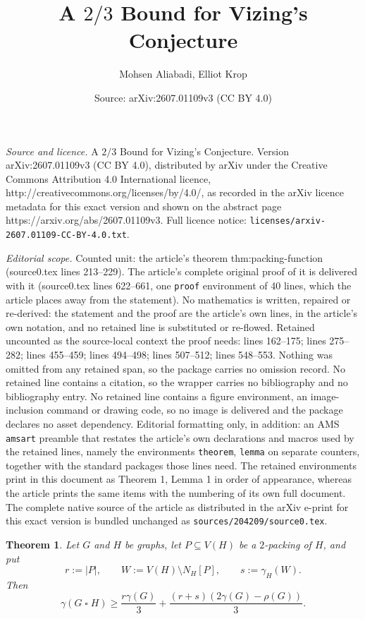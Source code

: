 \documentclass[10pt,a4paper]{amsart}
\title{A $2/3$ Bound for Vizing's Conjecture}
\author{Mohsen Aliabadi, Elliot Krop}
\date{Source: arXiv:2607.01109v3 (CC BY 4.0)}
\newtheorem{theorem}{Theorem}
\newcommand{\N}{N}
\newcommand{\V}{V}
\begin{document}
\maketitle

\noindent\emph{Source and licence.} A $2/3$ Bound for Vizing's Conjecture. Version arXiv:2607.01109v3 (CC BY 4.0), distributed by arXiv under the Creative Commons Attribution 4.0 International licence, http://creativecommons.org/licenses/by/4.0/, as recorded in the arXiv licence metadata for this exact version and shown on the abstract page https://arxiv.org/abs/2607.01109v3. Full licence notice: \texttt{licenses/arxiv-2607.01109-CC-BY-4.0.txt}.\par\smallskip

\noindent\textit{Editorial scope.} Counted unit: the article's theorem thm:packing-function (source0.tex lines 213--229). The article's complete original proof of it is delivered with it (source0.tex lines 622--661, one \texttt{proof} environment of 40 lines, which the article places away from the statement). No mathematics is written, repaired or re-derived: the statement and the proof are the article's own lines, in the article's own notation, and no retained line is substituted or re-flowed.  Retained uncounted as the source-local context the proof needs: lines 162--175; lines 275--282; lines 455--459; lines 494--498; lines 507--512; lines 548--553.  Nothing was omitted from any retained span, so the package carries no omission record.  No retained line contains a citation, so the wrapper carries no bibliography and no bibliography entry.  No retained line contains a figure environment, an image-inclusion command or drawing code, so no image is delivered and the package declares no asset dependency.  Editorial formatting only, in addition: an AMS \texttt{amsart} preamble that restates the article's own declarations and macros used by the retained lines, namely the environments \texttt{theorem}, \texttt{lemma} on separate counters, together with the standard packages those lines need.  The retained environments print in this document as Theorem 1, Lemma 1 in order of appearance, whereas the article prints the same items with the numbering of its own full document.  The complete native source of the article as distributed in the arXiv e-print for this exact version is bundled unchanged as \texttt{sources/204209/source0.tex}.
\begin{theorem}\label{thm:main-packing}
Let $G$ and $H$ be graphs, let $P\subseteq\V(H)$ be a $2$-packing of $H$, and
put
\[
 r:=|P|,\qquad W:=\V(H)\setminus\N_H[P],\qquad s:=\gamma_H(W).
\]
Then
\begin{equation}
 \gamma(G\mathbin{\square}H)
 \geq \frac{r\gamma(G)}{3}
 +\frac{(r+s)(2\gamma(G)-\rho(G))}{3}.
 \label{eq:main-packing}
\end{equation}
\end{theorem}
\end{document}
